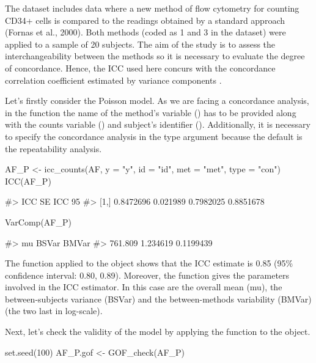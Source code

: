 The dataset  includes data where a new method of flow cytometry
for counting CD34+ cells is compared to the readings obtained by a
standard approach (Fornas et al., 2000). Both methods (coded as 1 and 3
in the dataset) were applied to a sample of 20 subjects. The aim of the
study is to assess the interchangeability between the methods so it is
necessary to evaluate the degree of concordance. Hence, the ICC used
here concurs with the concordance correlation coefficient estimated by
variance components \citep{carrasco2003}.

Let's firstly consider the Poisson model. As we are facing a concordance
analysis, in the  function the name of the method's
variable () has to be provided along with the counts variable
() and subject's identifier (). Additionally, it is
necessary to specify the concordance analysis in the type argument
because the default is the repeatability analysis.

\begin{Schunk}
\begin{Sinput}
AF_P <- icc_counts(AF, y = "y", id = "id", met = "met", type = "con")
ICC(AF_P)
\end{Sinput}
\begin{Soutput}
#>            ICC   SE ICC 95% CI LL 95% CI UL
#> [1,] 0.8472696 0.021989 0.7982025 0.8851678
\end{Soutput}
\begin{Sinput}
VarComp(AF_P)
\end{Sinput}
\begin{Soutput}
#>       mu    BSVar     BMVar
#>  761.809 1.234619 0.1199439
\end{Soutput}
\end{Schunk}

The function  applied to the  object shows that the
ICC estimate is 0.85 (95\% confidence interval: 0.80, 0.89). Moreover,
the function  gives the parameters involved in the ICC
estimator. In this case are the overall mean (mu), the between-subjects
variance (BSVar) and the between-methods variability (BMVar) (the two
last in log-scale).

Next, let's check the validity of the model by applying the function
 to the  object.

\begin{Schunk}
\begin{Sinput}
set.seed(100)
AF_P.gof <- GOF_check(AF_P)
\end{Sinput}
\end{Schunk}

